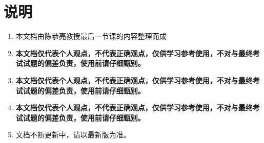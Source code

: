 \section{说明}
\begin{enumerate}
  \item 本文档由陈恭亮教授最后一节课的内容整理而成
  \item \textbf{本文档仅代表个人观点，不代表正确观点，仅供学习参考使用，不对与最终考试试题的偏差负责，使用前请仔细甄别。}
  \item \textbf{本文档仅代表个人观点，不代表正确观点，仅供学习参考使用，不对与最终考试试题的偏差负责，使用前请仔细甄别。}
  \item \textbf{本文档仅代表个人观点，不代表正确观点，仅供学习参考使用，不对与最终考试试题的偏差负责，使用前请仔细甄别。}
  \item 文档不断更新中，请以最新版为准。
\end{enumerate}